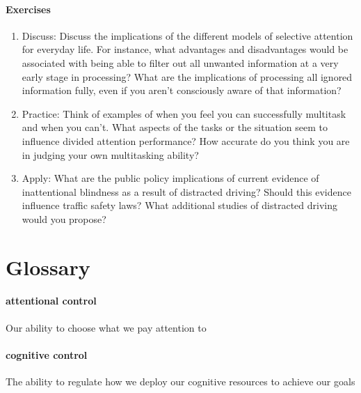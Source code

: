 \documentclass[
]{krantz}
\providecommand{\tightlist}{%
  \setlength{\itemsep}{0pt}\setlength{\parskip}{0pt}}
\begin{document}
\paragraph*{Exercises}\label{exercises-2}

\begin{enumerate}
\def\labelenumi{\arabic{enumi}.}
\tightlist
\item
  Discuss: Discuss the implications of the different models of selective attention for everyday life. For instance, what advantages and disadvantages would be associated with being able to filter out all unwanted information at a very early stage in processing? What are the implications of processing all ignored information fully, even if you aren't consciously aware of that information?
\item
  Practice: Think of examples of when you feel you can successfully multitask and when you can't. What aspects of the tasks or the situation seem to influence divided attention performance? How accurate do you think you are in judging your own multitasking ability?
\item
  Apply: What are the public policy implications of current evidence of inattentional blindness as a result of distracted driving? Should this evidence influence traffic safety laws? What additional studies of distracted driving would you propose?
\end{enumerate}

\section{Glossary}\label{glossary-2}

\paragraph*{attentional control}\label{attentional-control}

Our ability to choose what we pay attention to

\paragraph*{cognitive control}\label{cognitive-control}

The ability to regulate how we deploy our cognitive resources to achieve our goals
\end{document}

